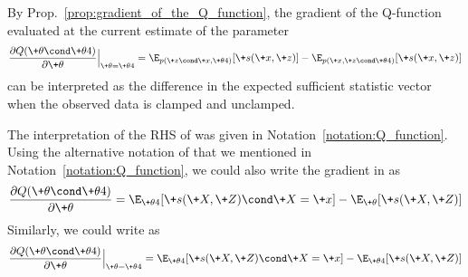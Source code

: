 \documentclass{article} %
\newcommand{\sufficientStatsFunction}{\+s}
\newcommand{\param}{\+\theta}
\begin{document}
\begin{corollary}
By Prop.~\ref{prop:gradient_of_the_Q_function}, the gradient of the Q-function evaluated at the current estimate of the parameter
%
\begin{align}
\frac{\partial Q(\param \cond \param^^t)}{\partial \param} \Bigr|_{\param = \param^^t} =  \E_{p(\+z \cond \+x, \param^^t)}[\sufficientStatsFunction(\+x,\+z)] - 	\E_{p(\+x, \+z \cond \param^^t)}[\sufficientStatsFunction(\+x,\+z)] 
\label{eqn:gradient_of_Q_function_as_difference_in_expected_sufficient_stats_with_clamped_and_unclamped_data}
\end{align}
%
can be interpreted as the difference in the expected sufficient statistic vector when the observed data is clamped and unclamped.
\end{corollary}



\begin{notation}
The interpretation of the RHS of  was given in Notation~\ref{notation:Q_function}.     Using the alternative notation of \citet{miller2011why} that we mentioned in Notation~\ref{notation:Q_function}, we could also write the gradient in  as 
 \begin{align}
 \frac{\partial Q(\param \cond \param^^t)}{\partial \param} =  \E_{\param^^t}[\sufficientStatsFunction(\+X,\+Z) \cond \+X=\+x] - 	\E_{\param}[\sufficientStatsFunction(\+X,\+Z)]
 \label{eqn:gradient_of_Q_function_for_EM_in_jeff_millers_notation}
 \end{align}
 Similarly, we could write  as
 \begin{align}
 \frac{\partial Q(\param \cond \param^^t)}{\partial \param} \Bigr|_{\param = \param^^t} =  \E_{\param^^t}[\sufficientStatsFunction(\+X,\+Z) \cond \+X=\+x] - 	\E_{\param^^t}[\sufficientStatsFunction(\+X,\+Z)]
 \label{eqn:the_gradient_of_the_Q_function_evaluated_at_the_current_parameter_and_using_jeffs_notation}
 \end{align}
\end{notation}

\end{document}
